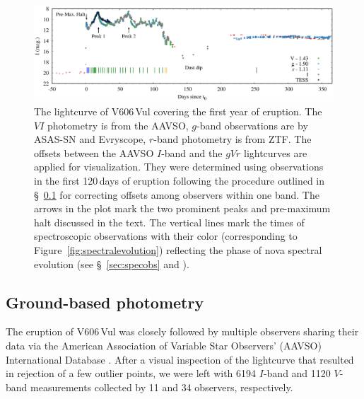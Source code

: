 \documentclass[twocolumn]{aastex631}
\newcommand{\nova}{V606\,Vul}
\begin{document}
\begin{figure}
\centering
        \includegraphics[width=1.0\textwidth,clip=true,trim=0.25cm 0.65cm 1.05cm 0.25cm,angle=0]{v606_vul_full_lightcurve.eps}
\caption{The lightcurve of \nova{} covering the first year of eruption. 
The $VI$ photometry is from the AAVSO, $g$-band observations are by ASAS-SN and Evryscope, $r$-band photometry is from ZTF. 
%
The offsets between the AAVSO $I$-band and the $gVr$ lightcurves are applied for visualization.
They were determined using observations in the first 120\,days of eruption following 
the procedure outlined in \S~\ref{sec:aavsoobs} for correcting offsets among observers within one band.
%
The arrows in the plot mark the two prominent peaks and pre-maximum halt discussed in the text. 
The vertical lines mark the times of spectroscopic observations with their color (corresponding to Figure~\ref{fig:spectralevolution}) 
reflecting the phase of nova spectral evolution (see \S~\ref{sec:specobs} and \citealt{2023arXiv230907097A}).}
    \label{fig:lcall}
\end{figure}


\subsection{Ground-based photometry}
\label{sec:aavsoobs}

The eruption of \nova{} was closely followed by multiple 
observers sharing their data via 
the American Association of Variable Star Observers' (AAVSO) International Database
\citep{AAVSODATA}. After a visual inspection of the lightcurve that resulted
in rejection of a few outlier points, we were left with 6194 $I$-band
and 1120 $V$-band measurements collected by 11 and 34 observers, respectively.
\end{document}
